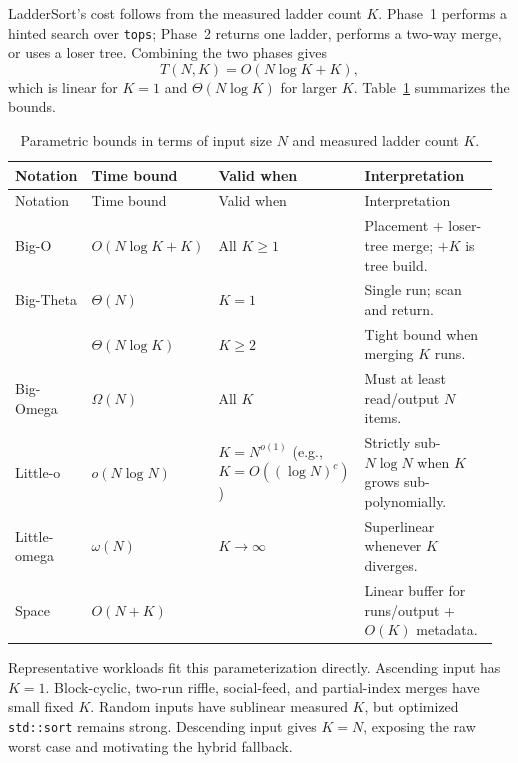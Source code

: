 \documentclass[10pt]{article}
\begin{document}
LadderSort's cost follows from the measured ladder count \(K\). Phase~1 performs a hinted search over \texttt{tops}; Phase~2 returns one ladder, performs a two-way merge, or uses a loser tree. Combining the two phases gives
\[
T(N,K)=O(N\log K + K),
\]
which is linear for \(K=1\) and \(\Theta(N\log K)\) for larger \(K\). Table~\ref{tab:parametric-bounds} summarizes the bounds.

{\scriptsize
\begin{longtable}{@{}p{0.14\linewidth}p{0.22\linewidth}p{0.18\linewidth}p{0.42\linewidth}@{}}
\caption{Parametric bounds in terms of input size \(N\) and measured ladder count \(K\).}
\label{tab:parametric-bounds}\\
\toprule
Notation & Time bound & Valid when & Interpretation \\
\midrule
\endfirsthead

\toprule
Notation & Time bound & Valid when & Interpretation \\
\midrule
\endhead

\bottomrule
\endfoot

\bottomrule
\endlastfoot

Big-O & \(O(N\log K + K)\) & All \(K\ge 1\) & Placement + loser-tree merge; \(+K\) is tree build. \\
Big-Theta & \(\Theta(N)\) & \(K=1\) & Single run; scan and return. \\
 & \(\Theta(N\log K)\) & \(K\ge 2\) & Tight bound when merging \(K\) runs. \\
Big-Omega & \(\Omega(N)\) & All \(K\) & Must at least read/output \(N\) items. \\
Little-o & \(o(N\log N)\) & \(K=N^{o(1)}\) (e.g., \(K=O((\log N)^c)\)) & Strictly sub-\(N\log N\) when \(K\) grows sub-polynomially. \\
Little-omega & \(\omega(N)\) & \(K\to\infty\) & Superlinear whenever \(K\) diverges. \\
Space & \(O(N+K)\) &  & Linear buffer for runs/output + \(O(K)\) metadata. \\
\end{longtable}
}

Representative workloads fit this parameterization directly. Ascending input has \(K=1\). Block-cyclic, two-run riffle, social-feed, and partial-index merges have small fixed \(K\). Random inputs have sublinear measured \(K\), but optimized \texttt{std::sort} remains strong. Descending input gives \(K=N\), exposing the raw worst case and motivating the hybrid fallback.
\end{document}
